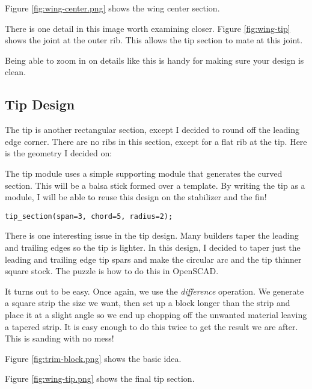 Figure \ref{fig:wing-center.png} shows the wing center section.


There is one detail in this image worth examining closer. Figure
\ref{fig:wing-tip} shows the joint at the outer rib. This allows the tip section
to mate at this joint.


Being able to zoom in on details like this is handy for making sure your design
is clean.

\subsection{Tip Design}

The tip is another rectangular section, except I decided to round off the
leading edge corner. There are no ribs in this section, except for a flat rib
at the tip. Here is the geometry I decided on:


The tip module uses a simple supporting module that generates the curved section.
This will be a balsa stick formed over a template.  By writing the tip as a
module, I will be able to reuse this design on the stabilizer and the fin!

\begin{lstlisting}
tip_section(span=3, chord=5, radius=2);
\end{lstlisting}

There is one interesting issue in the tip design. Many builders taper the
leading and trailing edges so the tip is lighter. In this design, I decided to
taper just the leading and trailing edge tip spars and make the circular arc
and the tip thinner square stock. The puzzle is how to do this in OpenSCAD.

It turns out to be easy. Once again, we use the {\it difference} operation. We
generate a square strip the size we want, then set up a block longer than the
strip and place it at a slight angle so we end up chopping off the unwanted
material leaving a tapered strip. It is easy enough to do this twice to get the
result we are after. This is sanding with no mess!

Figure \ref{fig:trim-block.png} shows the basic idea.



Figure \ref{fig:wing-tip.png} shows the final tip section.

